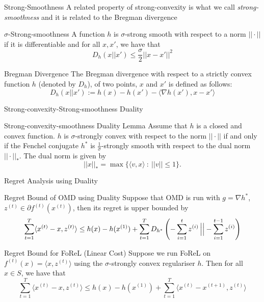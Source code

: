 \begin{frame}{Strong-Smoothness}
    A related property of strong-convexity is what we call \textit{strong-smoothness} and it is related to the Bregman divergence
    \begin{block}{$\sigma$-Strong-smoothness}
        A function $h$ is $\sigma$-strong smooth with respect to a norm $||\cdot||$ if it is differentiable and for all $x, x'$, we have that
        \begin{equation}
            D_h(x||x') \leq \frac{\sigma}{2}||x - x'||^2
        \end{equation}
    \end{block}
    \begin{block}{Bregman Divergence}
        The Bregman divergence with respect to a strictly convex function $h$ (denoted by $D_h$), of two points, $x$ and $x'$ is defined as follows:
        \begin{equation}
            D_h(x || x') := h(x) - h(x') - \langle\nabla h(x'),  x - x' \rangle
        \end{equation}
    \end{block}
\end{frame}

\begin{frame}{Strong-convexity-Strong-smoothness Duality}
    \begin{block}{Strong-convexity-smoothness Duality Lemma}
        Assume that $h$ is a closed and convex function. $h$ is $\sigma$-strongly convex with respect to the norm $||\cdot||$ if and only if the Fenchel conjugate $h^*$ is $\frac{1}{\sigma}$-strongly smooth with respect to the dual norm $||\cdot||_*$. The dual norm is given by
        $$
        ||x||_* = \max\{ \langle v, x \rangle \  : \ ||v|| \leq 1 \}.
        $$
    \end{block}
\end{frame}

\begin{frame}{Regret Analysis using Duality}
    \begin{block}{Regret Bound of OMD using Duality}
        Suppose that OMD is run with $g = \nabla h^*$, $z^{(t)} \in \partial f^{(t)}(x^{(t)})$, then its regret is upper bounded by
        $$
        \sum_{t=1}^T\langle x^{(t)} - x, z^{(t)} \rangle \leq h(x) - h(x^{(1)}) + \sum_{t=1}^T D_{h^*}\left(-\sum_{i=1}^t z^{(i)} \left\vert \vphantom{\frac{a}{b}} \right\vert  -\sum_{i=1}^{t-1}z^{(i)}\right)
        $$
    \end{block}\pause
    \begin{block}{Regret Bound for FoReL (Linear Cost)}
        Suppose we run FoReL on $f^{(t)}(x) = \langle x, z^{(t)}\rangle$ using the $\sigma$-strongly convex regulariser $h$. Then for all $x \in S$, we have that
        $$
        \sum_{t=1}^T \langle x^{(t)} - x, z^{(t)} \rangle \leq h(x) - h(x^{(1)}) + \sum_{t=1}^T \langle x^{(t)} - x^{(t+1)}, z^{(t)} \rangle 
        $$
    \end{block}
\end{frame}


